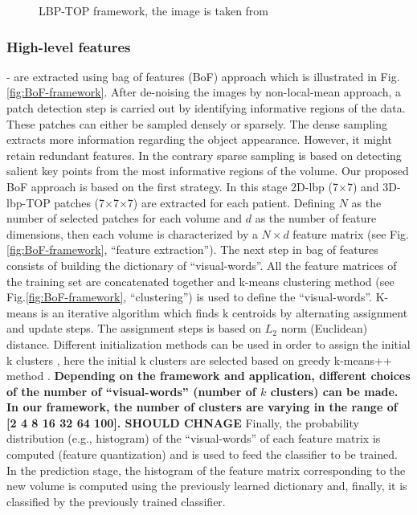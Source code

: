 \begin{figure}
\caption{LBP-TOP framework, the image is taken from \cite{JiangEtAl13}}
\label{fig:LBPTOP-framework}
\end{figure}



\subsubsection{High-level features} - are extracted using bag of features (BoF) approach which is illustrated in Fig. \ref{fig:BoF-framework}. After de-noising the images by non-local-mean approach, a patch detection step is carried out by identifying informative regions of the data. These patches can either be sampled densely or sparsely. The dense sampling extracts more information regarding the object appearance. However, it might retain redundant features. In the contrary sparse sampling is based on detecting salient key points from the most informative regions of the volume. Our proposed BoF approach is based on the first strategy. In this stage 2D-\ac{lbp} (7$\times$7) and 3D-\ac{lbp}-TOP patches (7$\times$7$\times$7) are extracted for each patient. Defining $N$ as the number of selected patches for each volume and $d$ as the number of feature dimensions, then each volume is characterized by a $N \times d$ feature matrix (see Fig. \ref{fig:BoF-framework}, ``feature extraction''). The next step in bag of features consists of building the dictionary of ``visual-words''. All the feature matrices of the training set are concatenated together and k-means clustering method (see Fig.\ref{fig:BoF-framework}, ``clustering'') is used to define the ``visual-words''. K-means is an iterative algorithm which finds k centroids by alternating assignment and update steps. The assignment steps is based on $L_{2}$ norm (Euclidean) distance. Different initialization methods can be used in order to assign the initial k clusters \cite {celebi2013comparative}, here the initial k clusters are selected based on greedy k-means++ method \cite{arthur2007k}. \textbf{Depending on the framework and application, different choices of the number of ``visual-words'' (number of $k$ clusters) can be made. In our framework, the number of clusters are varying in the range of [2 4 8 16 32 64 100]. SHOULD CHNAGE} Finally, the probability distribution (e.g., histogram) of the ``visual-words'' of each feature matrix is computed (feature quantization) and is used to feed the classifier to be trained. In the prediction stage, the histogram of the feature matrix corresponding to the new volume is computed using the previously learned dictionary and, finally, it is classified by the previously trained classifier.\\


